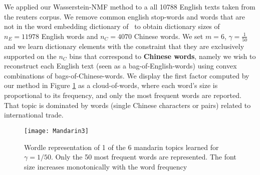 We applied our Wasserstein-NMF method to a all 10788 English texts taken from the reuters corpus. We remove common english stop-words and words that are not in the word embedding dictionary of~\cite{zou2013} to obtain dictionary sizes of $n_E=11978$ English words and $n_C = 4070$ Chinese words. We set $m=6$, $\gamma=\frac{1}{50}$ and we learn dictionary elements with the constraint that they are exclusively supported on the $n_C$ bins that correspond to \textbf{Chinese words}, namely we wish to reconstruct each English text (seen as a bag-of-English-words) using convex combinations of bags-of-Chinese-words. We display the first factor computed by our method in Figure \ref{fig:mandarin} as a cloud-of-words, where each word's size is proportional to its frequency, and only the most frequent words are reported. That topic is dominated by words (single Chinese characters or pairs) related to international trade.

\begin{figure}[!h]
        \centering
        \texttt{[image: Mandarin3]}
\caption{Wordle representation of 1 of the 6 mandarin topics learned for $\gamma=1/50$. Only the 50 most frequent words are represented. The font size increases monotonically with the word frequency}\label{fig:mandarin}
\end{figure}
